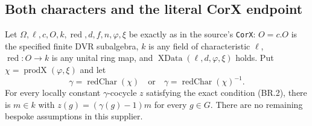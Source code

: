 \subsection{Both characters and the literal CorX endpoint}

\begin{proposition}
\label{prop:br-cor-x}
Let $\Omega,\ell,c,O,k,\operatorname{red},d,f,n,\varphi,\xi$
be exactly as in the source's \texttt{CorX}: $O=c.O$ is the
specified finite DVR subalgebra, $k$ is any field of characteristic
$\ell$, $\operatorname{red}:O\to k$ is any unital ring map,
and $\operatorname{XData}(\ell,d,\varphi,\xi)$ holds.
Put $\chi=\operatorname{prodX}(\varphi,\xi)$ and let
\[
        \gamma=\operatorname{redChar}(\chi)
          \quad\text{or}\quad
        \gamma=\operatorname{redChar}(\chi)^{-1}.
        \tag{BR.43}
\]
For every locally constant $\gamma$-cocycle $z$ satisfying the
exact condition (BR.2), there is $m\in k$ with
$z(g)=(\gamma(g)-1)m$ for every $g\in G$.
There are no remaining bespoke assumptions in this supplier.
\end{proposition}

